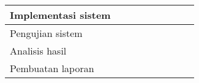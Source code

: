 \documentclass[../Book, Implementasi Algoritma Merging Context Seeds untuk Plagiarism Detection.tex]{subfiles}
\begin{document}
\begin{table}[H]
{\begin{tabular}{@{}lllllllll@{}}
				\\ \midrule
				Implementasi sistem                            
				&                          
				&                          
				& \cellcolor[HTML]{333333}                          
				& \cellcolor[HTML]{333333} 
				& \cellcolor[HTML]{333333}     
				& \cellcolor[HTML]{333333}                         
				&                          
				&                     
				
				\\ \midrule
				Pengujian sistem                               
				&                          
				&                          
				&                          
				&                          
				& \cellcolor[HTML]{333333} 
				& \cellcolor[HTML]{333333}                          
				& \cellcolor[HTML]{333333}                          
				&                        
				
				\\ \midrule
				Analisis hasil                                 
				&                          
				&                          
				&                          
				&                           
				& \cellcolor[HTML]{333333}   
				& \cellcolor[HTML]{333333}                          
				& \cellcolor[HTML]{333333}                          
				&                     
				
				\\ \midrule
				Pembuatan laporan                              
				&                          
				&                          
				& \cellcolor[HTML]{333333}                         
				& \cellcolor[HTML]{333333}                          
				& \cellcolor[HTML]{333333} 
				& \cellcolor[HTML]{333333}                         
				& \cellcolor[HTML]{333333}                         
				& \cellcolor[HTML]{333333}
				
				\\ \bottomrule
			\end{tabular}
		}
		\label{jadwal-kegiatan}
	\end{table}
\end{document}
